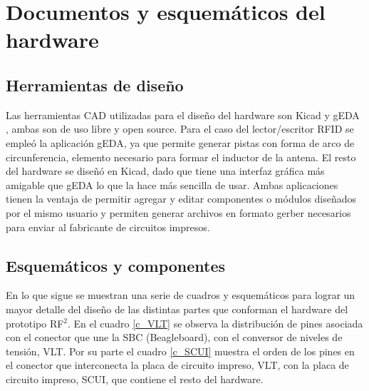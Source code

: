 \chapter{Documentos y esquemáticos del hardware}\label{docHW}

\section{Herramientas de diseño}
Las herramientas CAD utilizadas para el diseño del hardware son Kicad \cite{KiCad} y gEDA \cite{gEDA}, ambas son de uso libre y open source.
Para el caso del lector/escritor RFID se empleó la aplicación gEDA, ya que permite generar 
pistas con forma de arco de circunferencia, elemento necesario para formar el inductor de la antena. 
El resto del hardware se diseñó en Kicad, dado que tiene una interfaz gráfica más amigable que gEDA lo que la hace más sencilla de usar.
Ambas aplicaciones tienen la ventaja de permitir agregar y editar componentes
o módulos diseñados por el mismo usuario y permiten generar archivos en formato
gerber necesarios para enviar al fabricante de circuitos impresos.


\section{Esquemáticos y componentes}

En lo que sigue se muestran una serie de cuadros y esquemáticos para lograr un 
mayor detalle del diseño de las distintas partes que conforman el hardware
del prototipo RF$^{2}$.
En el cuadro \ref{c_VLT} se observa la distribución de pines asociada con el conector
que une la SBC (Beagleboard), con el conversor de niveles de tensión, VLT.
Por su parte el cuadro \ref{c_SCUI} muestra el orden de los pines en el conector que 
interconecta la placa de circuito impreso, VLT, con la placa de circuito
impreso, SCUI, que contiene el resto del hardware. 


